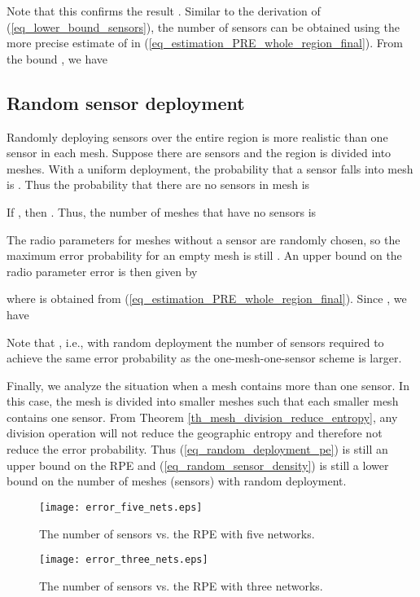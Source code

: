 \documentclass[conference]{IEEEtran}
\begin{document}
Note that this confirms the result .
Similar to the derivation of (\ref{eq_lower_bound_sensors}), the number of sensors
can be obtained using the more precise estimate of  in (\ref{eq_estimation_PRE_whole_region_final}).
From the bound , we have


\subsection{Random sensor deployment}

Randomly deploying sensors over the entire region is more realistic than one sensor in each mesh.
Suppose there are  sensors and the region is divided into  meshes.
With a uniform deployment, the probability that a sensor falls into mesh  is .
Thus the probability that there are no sensors in mesh  is

If , then .
Thus, the number of meshes that have no sensors is

The radio parameters for meshes without a sensor are randomly chosen, so
the maximum error probability for an empty mesh is still .
An upper bound on the radio parameter error is then given by

where  is obtained from (\ref{eq_estimation_PRE_whole_region_final}).
Since , we have


Note that , i.e., with random deployment the number of sensors required to achieve the same error probability as
the one-mesh-one-sensor scheme is larger.

Finally, we analyze the situation when a mesh contains more than one sensor.
In this case, the mesh is divided into smaller meshes such that each smaller mesh contains one sensor.
From Theorem \ref{th_mesh_division_reduce_entropy}, any division operation will not reduce the geographic entropy and therefore not reduce the error probability.
Thus (\ref{eq_random_deployment_pe}) is still an upper bound on the RPE and (\ref{eq_random_sensor_density}) is still a lower bound on the number of meshes (sensors)
with random deployment.

\begin{figure}[!t]
\centering
\texttt{[image: error\_five\_nets.eps]}
\caption{The number of sensors vs. the RPE with five networks.} \label{fig_five_nets}
\end{figure}

\begin{figure}[!t]
\centering
\texttt{[image: error\_three\_nets.eps]}
\caption{The number of sensors vs. the RPE with three networks.} \label{fig_three_nets}
\end{figure}
\end{document}

